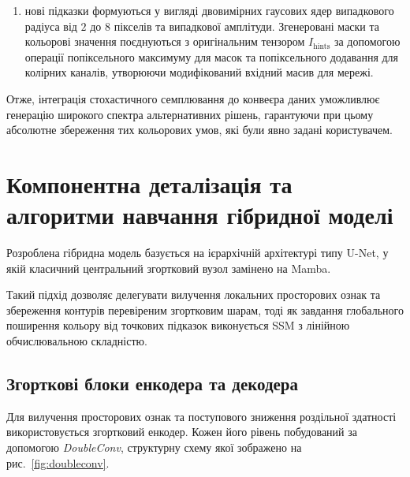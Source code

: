 \begin{enumerate}
                \item нові підказки формуються у вигляді двовимірних гаусових ядер випадкового радіуса від $2$ до $8$ пікселів та випадкової амплітуди.
                    Згенеровані маски та кольорові значення поєднуються з оригінальним тензором $I_{\mathrm{hints}}$
                    за допомогою операції попіксельного максимуму для масок та попіксельного додавання для колірних каналів,
                    утворюючи модифікований вхідний масив для мережі.
            \end{enumerate}

            Отже, інтеграція стохастичного семплювання до конвеєра даних уможливлює генерацію широкого спектра альтернативних рішень,
            гарантуючи при цьому абсолютне збереження тих кольорових умов, які були явно задані користувачем.

    \section{Компонентна деталізація та алгоритми навчання гібридної моделі}
        Розроблена гібридна модель базується на ієрархічній архітектурі типу U-Net,
        у якій класичний центральний згортковий вузол замінено на Mamba.
        
        Такий підхід дозволяє делегувати вилучення локальних просторових ознак та збереження контурів перевіреним згортковим шарам,
        тоді як завдання глобального поширення кольору від точкових підказок виконується SSM з лінійною обчислювальною складністю.

        \subsection{Згорткові блоки енкодера та декодера}
    
            Для вилучення просторових ознак та поступового зниження роздільної здатності використовується згортковий енкодер.
            Кожен його рівень побудований за допомогою \textit{DoubleConv}, структурну схему якої зображено на рис.~\ref{fig:doubleconv}.

